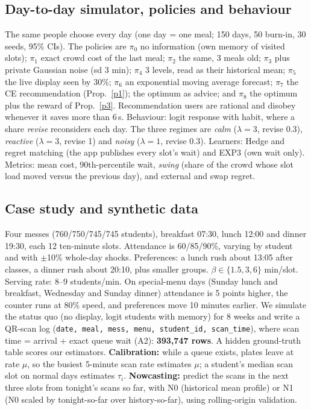 \documentclass{article}
\begin{document}
\subsection{Day-to-day simulator, policies and behaviour}
The same people choose every day (one day = one meal; 150 days, 50 burn-in, 30 seeds, 95\% CIs). The policies are
\textbf{$\pi_0$} no information (own memory of visited slots); \textbf{$\pi_1$} exact crowd cost of the last meal;
\textbf{$\pi_2$} the same, 3 meals old; \textbf{$\pi_3$} plus private Gaussian noise (sd 3 min); \textbf{$\pi_4$}
3 levels, read as their historical mean; \textbf{$\pi_5$} the live display seen by 30\%; \textbf{$\pi_6$} an
exponential moving average forecast; \textbf{$\pi_7$} the CE recommendation (Prop.~\ref{p1}); the optimum as advice;
and \textbf{$\pi_8$} the optimum plus the reward of Prop.~\ref{p3}. Recommendation users are rational and disobey
whenever it saves more than 6\,s. Behaviour: logit response with habit, where a share \emph{revise} reconsiders each
day. The three regimes are \emph{calm} ($\lambda{=}3$, revise 0.3), \emph{reactive} ($\lambda{=}3$, revise 1) and
\emph{noisy} ($\lambda{=}1$, revise 0.3). Learners: Hedge and regret matching (the app publishes every slot's
wait) and EXP3 (own wait only). Metrics: mean cost, 90th-percentile wait, \emph{swing} (share of the crowd whose
slot load moved versus the previous day), and external and swap regret.

\subsection{Case study and synthetic data}
Four messes (760/750/745/745 students), breakfast 07:30, lunch 12:00 and dinner 19:30, each 12 ten-minute slots.
Attendance is 60/85/90\%, varying by student and with $\pm$10\% whole-day shocks. Preferences: a lunch rush about
13:05 after classes, a dinner rush about 20:10, plus smaller groups. $\beta\in\{1.5,3,6\}$ min/slot. Serving
rate: 8--9 students/min. On special-menu days (Sunday lunch and breakfast, Wednesday and Sunday dinner)
attendance is 5 points higher, the counter runs at 80\% speed, and preferences move 10 minutes earlier. We simulate the
status quo (no display, logit students with memory) for 8 weeks and write a QR-scan log
(\texttt{date, meal, mess, menu, student\_id, scan\_time}), where scan time = arrival + exact queue wait (A2):
\textbf{393,747 rows}. A hidden ground-truth table scores our estimators. \textbf{Calibration:} while a queue exists,
plates leave at rate $\mu$, so the busiest 5-minute scan rate estimates $\mu$; a student's median scan slot on
normal days estimates $\tau_i$. \textbf{Nowcasting:} predict the scans in the next three slots from tonight's scans
so far, with N0 (historical mean profile) or N1 (N0 scaled by tonight-so-far over history-so-far), using
rolling-origin validation.
\end{document}
